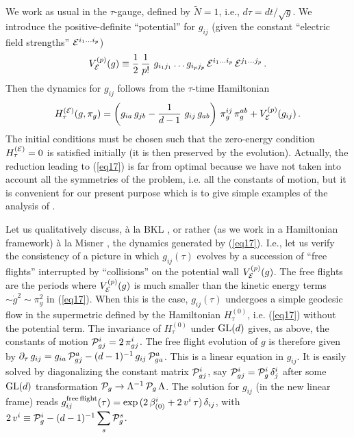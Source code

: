 \documentclass[a4paper,12pt]{article}
\begin{document}
We work as usual in the $\tau$-gauge, defined by $\tilde{N} = 1$,
i.e., $d \tau = dt / \sqrt g$. We introduce the 
positive-definite ``potential'' for $g_{ij}$ (given the constant 
``electric field strengths'' ${\cal E}^{i_1 \ldots i_p}$)
\begin{equation}
V_{\cal E}^{(p)} (g) \equiv \frac{1}{2} \, \frac{1}{p!} \ g_{i_1 j_1} 
\ldots g_{i_p j_p} \, {\cal E}^{i_1 \ldots i_p} \, {\cal E}^{j_1 \ldots 
j_p} \, . \label{eq15}
\end{equation}
Then the dynamics for $g_{ij}$ follows from the $\tau$-time 
Hamiltonian
\begin{equation}
H_{\tau}^{({\cal E})} (g, \pi_g) = \left( g_{ia} \, g_{jb} - 
\frac{1}{d-1} \ g_{ij} \, g_{ab} \right) \, \pi_g^{ij} \, \pi_g^{ab} + 
V_{\cal E}^{(p)} (g_{ij}) \, . \label{eq17}
\end{equation}
The initial conditions must be chosen such that the zero-energy 
condition $ H_{\tau}^{({\cal E})} = 0$ is satisfied initially (it is 
then preserved by the evolution). Actually, the reduction leading to 
(\ref{eq17}) is far from optimal because we have not 
taken into account all the symmetries of the problem, i.e. all the 
constants of motion, but it is convenient for our present purpose which 
is to give simple examples of the analysis of \cite{dh1}. 

Let us qualitatively discuss, \`a la BKL \cite{BKL}, 
or rather (as we work in
a Hamiltonian framework) \`a la Misner \cite{misner69},
the dynamics generated by 
(\ref{eq17}). I.e., let us verify the consistency of a picture 
in which $g_{ij} (\tau)$ evolves by a succession of ``free flights'' 
interrupted by ``collisions'' on the potential wall $V_{\cal E}^{(p)} 
(g)$. The free flights are the periods where $V_{\cal E}^{(p)} (g)$ is 
much smaller than the kinetic energy terms $\sim \dot g^2 \sim \pi_g^2$ 
in (\ref{eq17}). When this is the case, $g_{ij} 
(\tau)$ undergoes a simple geodesic flow in the supermetric
defined by the Hamiltonian $H_{\tau}^{(0)}$, i.e. (\ref{eq17}) without the
potential term. The invariance of $H_{\tau}^{(0)}$ under ${\rm GL} (d)$ 
gives, as above, the constants of motion ${\cal 
P}_{gj}^i = 2 \, \pi_{gj}^i$. The free flight evolution of $g$ is 
therefore given by 
$\partial_{\tau} \, g_{ij} = g_{ia} \, {\cal 
P}_{gj}^a - (d-1)^{-1} \, g_{ij} \, {\cal P}_{ga}^a$. This is a linear 
equation in $g_{ij}$. It is easily solved by diagonalizing the constant 
matrix ${\cal P}_{gj}^i$, say ${\cal P}_{gj}^i = {\cal P}_g^i \, 
\delta_j^i$  after some ${\rm GL} (d)$ transformation ${\cal P}_g 
\rightarrow \Lambda^{-1} \, {\cal P}_g \, \Lambda$. The solution for 
$g_{ij}$ (in the new linear frame) reads
$g_{ij}^{\rm free \, flight} (\tau) = \exp \, (2 \, \beta_{(0)}^i + 2 \, 
v^i \, \tau) \, \delta_{ij}$, 
with $2 \, v^i \equiv {\cal P}_g^i - (d-1)^{-1} \, {\displaystyle 
\sum_s} \, {\cal P}_g^s$. 
\end{document}
